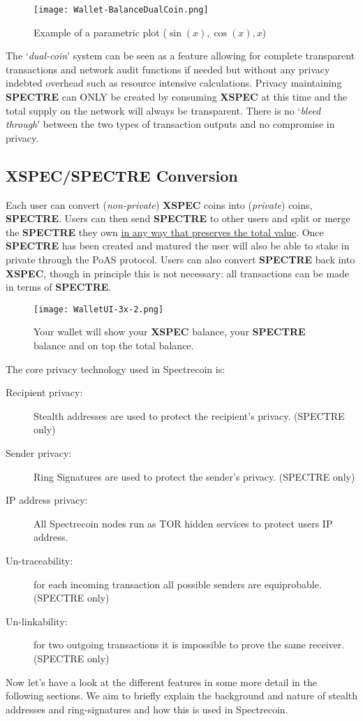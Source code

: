 \begin{figure}[h]
	\caption{Example of a parametric plot ($\sin (x), \cos(x), x$)}
	\centering
	\texttt{[image: Wallet-BalanceDualCoin.png]}
\end{figure}



The ‘\textit{dual-coin}’ system can be seen as a feature allowing for complete
transparent transactions and network audit functions if needed but
without any privacy indebted overhead such as resource intensive
calculations. Privacy maintaining \textbf{SPECTRE} can ONLY be created by
consuming \textbf{XSPEC} at this time and the total supply on the network
will always be transparent. There is no ‘\textit{bleed through}’ between the
two types of transaction outputs and no compromise in privacy.



\subsection{XSPEC/SPECTRE Conversion}
Each user can convert (\textit{non-private}) \textbf{XSPEC} coins into (\textit{private}) coins, \textbf{SPECTRE}.
Users can then send \textbf{SPECTRE} to other users and split or merge the \textbf{SPECTRE} they
own \underline{in any way that preserves the total value}. Once \textbf{SPECTRE} has been created
and matured the user will also be able to stake in private through the PoAS
protocol. Users can also convert \textbf{SPECTRE} back into \textbf{XSPEC}, though in principle
this is not necessary: all transactions can be made in terms of \textbf{SPECTRE}.



\begin{figure}[h]
	\caption{Your wallet will show your \textbf{XSPEC} balance, your 
		\textbf{SPECTRE} balance and on top the total balance.}
	\centering
	\texttt{[image: WalletUI-3x-2.png]}
\end{figure}




The core privacy technology used in Spectrecoin is: 



\begin{description}
	\item[Recipient privacy:] Stealth addresses are used to protect the recipient’s privacy. (SPECTRE only)
	\item[Sender privacy:] Ring Signatures are used to protect the sender’s privacy. (SPECTRE only)
	\item[IP address privacy:] All Spectrecoin nodes run as TOR hidden services to protect users IP address.
	\item[Un-traceability:] for each incoming transaction all possible senders are equiprobable. (SPECTRE only)
	\item[Un-linkability:] for two outgoing transactions it is impossible to prove the same receiver. (SPECTRE only)
\end{description}
         



Now let’s have a look at the different features in some more detail in the
following sections. We aim to briefly explain the background and nature of
stealth addresses and ring-signatures and how this is used in Spectrecoin.
